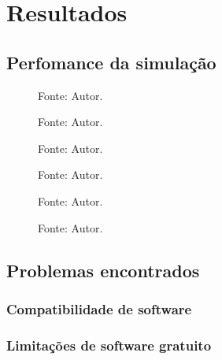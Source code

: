 \chapter{Resultados}

\section{Perfomance da simulação}

\begin{figure}[H]
    \centering
    \caption{\lstinline|simul_POLY_3_R_50|}
    
    \caption*{Fonte: Autor.}
\end{figure}

\begin{figure}[H]
    \centering
    \caption{\lstinline|simul_POLY_3_R_50_SNR_1_ATT|}
    
    \caption*{Fonte: Autor.}
\end{figure}

\begin{figure}[H]
    \centering
    \caption{\lstinline|simul_POLY_3_R_50_SNR_1|}
    
    \caption*{Fonte: Autor.}
\end{figure}



\begin{figure}[H]
    \centering
    \caption{\lstinline|simul_POLY_5_R_50|}
    
    \caption*{Fonte: Autor.}
\end{figure}

\begin{figure}[H]
    \centering
    \caption{\lstinline|simul_POLY_5_R_50_SNR_1|}
    
    \caption*{Fonte: Autor.}
\end{figure}

\begin{figure}[H]
    \centering
    \caption{\lstinline|simul_POLY_5_R_50_SNR_1_ATT|}
    
    \caption*{Fonte: Autor.}
\end{figure}




\section{Problemas encontrados}

\subsection{Compatibilidade de software}

\subsection{Limitações de software gratuito}


